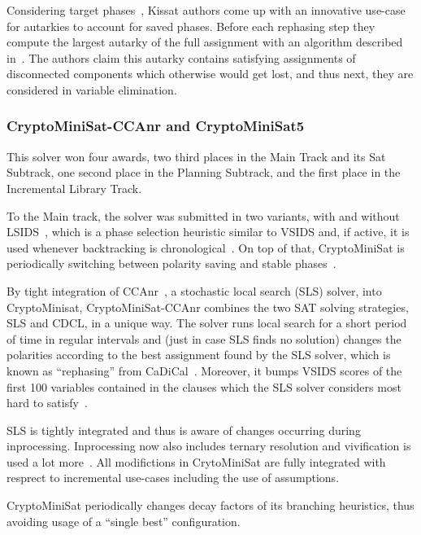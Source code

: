 \documentclass{elsarticle}
\begin{document}
Considering target phases~\cite{Biere:SC2019}, Kissat authors come up with an innovative use-case for autarkies to account for saved phases. 
Before each rephasing step they compute the largest autarky of the full assignment with an algorithm described in~\cite{Kiesl:2019:Autarkies}. 
The authors claim this autarky contains satisfying assignments of disconnected components which otherwise would get lost, and thus next, they are considered in variable elimination. 

\subsubsection{CryptoMiniSat-CCAnr and CryptoMiniSat5}

This solver won four awards, two third places in the Main Track and its Sat Subtrack, one second place in the Planning Subtrack, and the first place in the Incremental Library Track. 

To the Main track, the solver was submitted in two variants, with and without LSIDS~\cite{Shaw:2020:LSIDS},
which is a phase selection heuristic similar to VSIDS and, if active, it is used whenever backtracking is chronological~\cite{Nadel:2018:CBT}. On top of that, CryptoMiniSat is periodically switching between polarity saving and stable phases~\cite{Biere:SC2019}.

By tight integration of CCAnr~\cite{Cai:2015:CCAnr}, a stochastic local search (SLS) solver, into CryptoMinisat, CryptoMiniSat-CCAnr combines the two SAT solving strategies, SLS and CDCL, in a unique way. 
The solver runs local search for a short period of time in regular intervals and (just in case SLS finds no solution)
changes the polarities according to the best assignment found by the SLS solver, which is known as ``rephasing'' from CaDiCal~\cite{Biere:SC2019}.
Moreover, it bumps VSIDS scores of the first 100 variables contained in the clauses which the SLS solver considers most hard to satisfy~\cite{Soos:SC2020}.

SLS is tightly integrated and thus is aware of changes occurring during inprocessing. 
Inprocessing now also includes ternary resolution and vivification is used a lot more~\cite{ChuMinLi:2020:Vivification}. 
All modifictions in CrytoMiniSat are fully integrated with resprect to incremental use-cases including the use of assumptions. 

CryptoMiniSat periodically changes decay factors of its branching heuristics, thus avoiding usage of a ``single best'' configuration.
\end{document}
